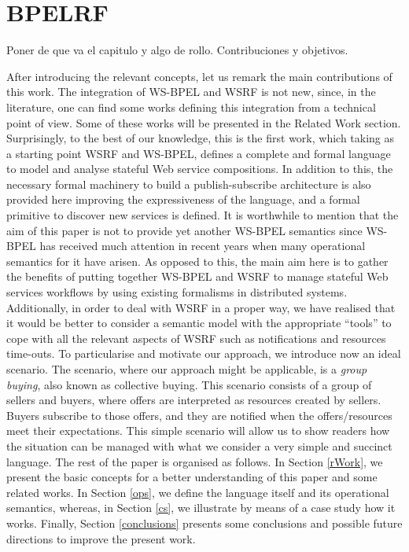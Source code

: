 \chapter{BPELRF}\label{chapter:c4}

Poner de que va el capitulo y algo de rollo. Contribuciones y objetivos.

After introducing the relevant concepts, let us remark the main contributions of this work. The integration of WS-BPEL and WSRF is not new, since, in the literature, one can find some works defining this integration from a technical point of view. Some of these works will be presented in the Related Work section. Surprisingly, to the best of our knowledge, this is the first work, which taking as a starting point WSRF and WS-BPEL, defines a complete and formal language to model and analyse stateful Web service compositions. In addition to this, the necessary formal machinery to build a publish-subscribe architecture is also provided here improving the expressiveness of the language, and a formal primitive to discover new services is defined. It is worthwhile to mention that the aim of this paper is not to provide yet another WS-BPEL semantics since WS-BPEL has received much attention in recent years when many operational semantics for it have arisen. As opposed to this, the main aim here is to gather the benefits of putting together WS-BPEL and WSRF to manage stateful Web services workflows by using existing formalisms in distributed systems. Additionally, in order to deal with WSRF in a proper way, we have realised that it would be better to consider a semantic model with the appropriate ``tools'' to cope with all the relevant aspects of WSRF such as notifications and resources time-outs. To particularise and motivate our approach, we introduce now an ideal scenario.
The scenario, where our approach might be applicable, is a \textsl{group buying}, also known as collective buying.
This scenario consists of a group of sellers and buyers, where offers are interpreted as resources created by sellers. Buyers subscribe to those offers, and they are notified when the offers/resources
meet their expectations. This simple scenario will allow us to show readers how the situation can be managed
with what we consider a very simple and succinct language.
The rest of the paper is organised as follows. In Section \ref{rWork}, we present the basic concepts for a better understanding of this paper and some related works. In Section \ref{ops}, we define the language itself and its operational semantics, whereas, in Section \ref{cs}, we illustrate by means of a case study how it works. Finally, Section \ref{conclusions} presents some conclusions and possible future directions to improve the present work.

